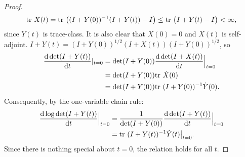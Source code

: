 \documentclass{amsart}
\numberwithin{equation}{section}
\begin{document}
\begin{proof}
\begin{align*}
    \textup{tr}\  X(t) = \textup{tr}\  \big ( (I+Y(0))^{-1} (I+Y(t)) - I \big )
    \leq \textup{tr}\  \big( I+Y(t) - I \big ) < \infty,
  \end{align*}
  since $Y(t)$ is trace-class. It is also clear that
  $X(0) = 0$ and $X(t)$ is self-adjoint.
  $I+Y(t) = (I+Y(0))^{1/2}(I+X(t))(I+Y(0))^{1/2}$, so
  \begin{align*}
    \frac{\text{\textup{d}} \det (I+Y(t))}{\text{\textup{d}} t}|_{t=0} 
    &= \det (I+Y(0))\frac{\text{\textup{d}} \det (I+X(t))}{\text{\textup{d}} t}\Big |_{t=0} \\
    &= \det (I+Y(0)) \textup{tr}\  \dot{X}(0) \\
    &= \det (I+Y(0)) \textup{tr}\  (I+Y(0))^{-1} \dot{Y}(0).
  \end{align*}
  Consequently, by the one-variable chain rule:
  \begin{align*}
    \frac{\text{\textup{d}} \log \det (I+Y(t))}{\text{\textup{d}} t}\Big |_{t=0} &=
    \frac{1}{\det (I+Y(0))}\frac{\text{\textup{d}} \det (I+Y(t))}{\text{\textup{d}} t}\Big |_{t=0} \\ 
    &= \textup{tr}\  (I+Y(t))^{-1} \dot{Y}(t) \big |_{t=0}.
  \end{align*}
  Since there is nothing special about $t=0$, the relation holds for all $t$.
\end{proof}
\end{document}
